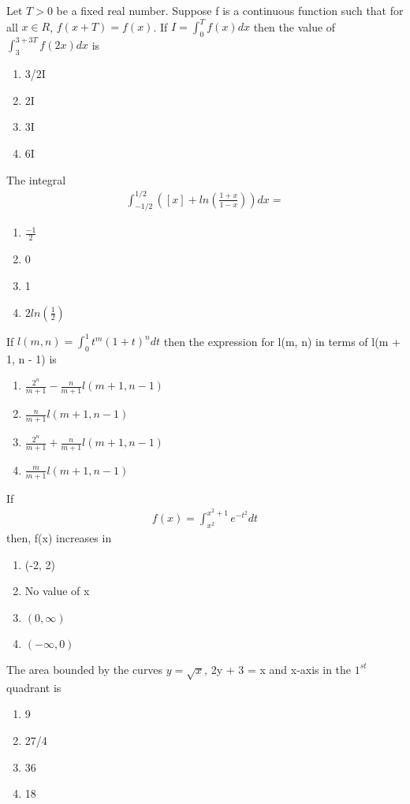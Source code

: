 \item Let  $T > 0$ be a fixed real number. Suppose f is a continuous function such that for all $x \in R$, $f(x + T) = f(x)$. If $I = \int_{0}^{T}f(x)dx$ then the value of $\int_{3}^{3 + 3T}f(2x)dx$ is
\begin{enumerate}
\item 3/2I
\item 2I
\item 3I
\item 6I
\end{enumerate}

\item The integral
\begin{align*}
\int_{-1/2}^{1/2}([x] + ln(\frac{1 + x}{1 - x}))dx = 
\end{align*}
\begin{enumerate}
\item $\frac{-1}{2}$
\item 0
\item 1
\item $2ln(\frac{1}{2})$
\end{enumerate}

\item If 
$l(m, n) = \int_{0}^{1}t^{m}(1 + t)^{n}dt$
then the expression for l(m, n) in terms of l(m + 1, n - 1) is
\begin{enumerate}
\item $\frac{2^n}{m + 1} - \frac{n}{m + 1}l(m + 1, n -1)$
\item $\frac{n}{m + 1}l(m + 1, n -1)$
\item $\frac{2^n}{m + 1} + \frac{n}{m + 1}l(m + 1, n -1)$
\item $\frac{m}{m + 1}l(m + 1, n -1)$
\end{enumerate}

\item If 
\begin{align*}
f(x) = \int_{x^{2}}^{x^{2} + 1}e^{-t^{2}}dt
\end{align*}
then, f(x) increases in
\begin{enumerate}
\item (-2, 2)
\item No value of x
\item $(0, \infty)$
\item $(-\infty, 0)$
\end{enumerate}

\item The area bounded by the curves $y = \sqrt{x}$, 2y + 3 = x and x-axis in the $1^{st}$ quadrant is
\begin{enumerate}
\item 9
\item 27/4
\item 36
\item 18
\end{enumerate}


